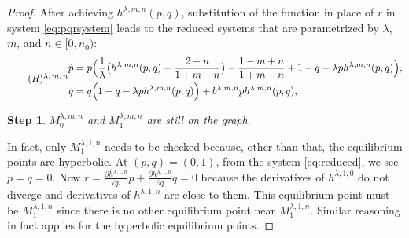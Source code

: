 \documentclass[a4paper,11pt]{article}
\newcounter{dummy}
\newtheorem{step}{Step}[dummy]
\numberwithin{step}{dummy}
\begin{document}
\begin{proof}
After achieving $h^{\lambda,m,n}(p,q)$, substitution of the function in place of $r$ in system \eqref{eq:pqrsystem} leads to  the reduced systems that are parametrized by $\lambda$, $m$, and $n\in[0,n_0)$:
{\small
\begin{equation} \tag*{(${R}$)\textsuperscript{$\lambda,m,n$}} \label{eq:reduced}
\begin{split}
 \dot{p} &=p\Big(\frac{1}{ \lambda }\big(h^{\lambda,m,n}(p,q) - \frac{2-n}{1+m-n}\big) - \frac{1-m+n}{1+m-n} + 1-q- \lambda p h^{\lambda,m,n}(p,q)\Big),\\
 \dot{q} &=q\Big(                                                                          1-q- \lambda p h^{\lambda,m,n}(p,q)\Big) + b^{\lambda,m,n}ph^{\lambda,m,n}(p,q),
\end{split}
\end{equation}
}

\begin{step}
 $M_0^{\lambda,m,n}$ and $M_1^{\lambda,m,n}$ are still on the graph.
\end{step}
In fact, only $M_1^{ \lambda,1,n}$ needs to be checked because, other than that, the equilibrium points are hyperbolic. At $(p,q)=(0,1)$, from the system \eqref{eq:reduced}, we see $\dot{p} = \dot{q} = 0$. Now $\dot{r} = \frac{\partial h^{\lambda,1,n}}{\partial p} \dot{p} + \frac{\partial h^{\lambda,1,n}}{\partial q} \dot{q} = 0$ %
because the derivatives of $h^{\lambda,1,0}$ do not diverge and derivatives of $h^{\lambda,1,n}$ are close to them. This equilibrium point must be $M_1^{\lambda,1,n}$ since there is no other equilibrium point near $M_1^{\lambda,1,n}$. Similar reasoning in fact applies for the hyperbolic equilibrium points.


\end{proof}
\end{document}
